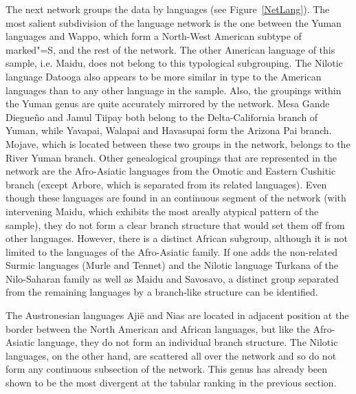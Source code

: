 The next network groups the data by languages (see Figure~\ref{NetLang}). 
The most salient subdivision of the language network is the one between the Yuman languages and Wappo, which form a North-West American subtype of marked"=S, and the rest of the network. 
The other American language of this sample, i.e. Maidu, does not belong to this typological subgrouping. 
The Nilotic language Datooga also appears to be more similar in type to the American languages than to any other language in the sample. 
Also, the groupings within the Yuman genus are quite accurately mirrored by the network. Mesa Gande Diegue\~no and Jamul Tiipay both belong to the Delta-California branch of Yuman, while Yavapai, Walapai and Havasupai form the Arizona Pai branch. 
Mojave, which is located between these two groups in the network, belongs to the River Yuman branch. 
Other genealogical groupings that are represented in the network are the Afro-Asiatic languages from the Omotic and Eastern Cushitic branch (except Arbore, which is separated from its related languages).
Even though these languages are found in an continuous segment of the network (with intervening Maidu, which exhibits the most areally atypical pattern of the sample), they do not form a clear branch structure that would set them off from other languages. 
However, there is a distinct African subgroup, although it is not limited to the languages of the Afro-Asiatic family. 
If one adds the non-related Surmic languages (Murle and Tennet) and the Nilotic language Turkana of the Nilo-Saharan family as well as Maidu and Savosavo, a distinct group separated from the remaining languages by a branch-like structure can be identified. 

The Austronesian languages Aji\"e and Nias are located in adjacent position at the border between the North American and African languages, but like the Afro-Asiatic language, they do not form an individual branch structure.
The Nilotic languages, on the other hand, are scattered all over the network and so do not form any continuous subsection of the network.
This genus has already been shown to be the most divergent at the tabular ranking in the previous section.

